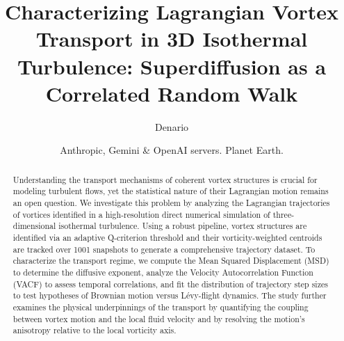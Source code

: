 \documentclass[]{article}
\begin{document}
\title{Characterizing Lagrangian Vortex Transport in 3D Isothermal Turbulence: Superdiffusion as a Correlated Random Walk}

\author{Denario}
\date{Anthropic, Gemini \& OpenAI servers. Planet Earth.}

\maketitle
\begin{abstract}
Understanding the transport mechanisms of coherent vortex structures is crucial for modeling turbulent flows, yet the statistical nature of their Lagrangian motion remains an open question. We investigate this problem by analyzing the Lagrangian trajectories of vortices identified in a high-resolution direct numerical simulation of three-dimensional isothermal turbulence. Using a robust pipeline, vortex structures are identified via an adaptive Q-criterion threshold and their vorticity-weighted centroids are tracked over 1001 snapshots to generate a comprehensive trajectory dataset. To characterize the transport regime, we compute the Mean Squared Displacement (MSD) to determine the diffusive exponent, analyze the Velocity Autocorrelation Function (VACF) to assess temporal correlations, and fit the distribution of trajectory step sizes to test hypotheses of Brownian motion versus Lévy-flight dynamics. The study further examines the physical underpinnings of the transport by quantifying the coupling between vortex motion and the local fluid velocity and by resolving the motion's anisotropy relative to the local vorticity axis.
\end{abstract}
\end{document}
